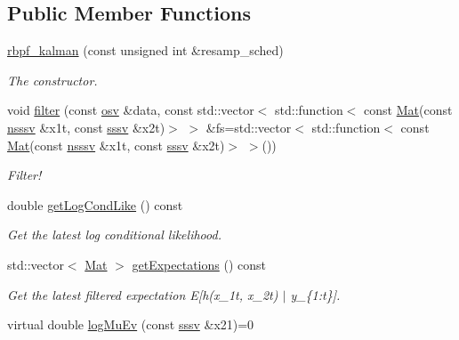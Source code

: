 \subsection*{Public Member Functions}
\begin{DoxyCompactItemize}
\item 
\hyperlink{classrbpf__kalman_abb378b7dd21fcf397d0f826ec4310244}{rbpf\+\_\+kalman} (const unsigned int \&resamp\+\_\+sched)
\begin{DoxyCompactList}\small\item\em The constructor. \end{DoxyCompactList}\item 
void \hyperlink{classrbpf__kalman_a66de4ab69c970a44493332f060380e65}{filter} (const \hyperlink{classrbpf__kalman_a4fdeb1b9b626811569b6ac4327c6cbb2}{osv} \&data, const std\+::vector$<$ std\+::function$<$ const \hyperlink{classrbpf__kalman_a042212551b46f72a5d3d58f7073d19ee}{Mat}(const \hyperlink{classrbpf__kalman_a887899234c374a04beba9669418577a7}{nsssv} \&x1t, const \hyperlink{classrbpf__kalman_a17f2cf0b4ee4a1c8f2bfdb5356c53844}{sssv} \&x2t)$>$ $>$ \&fs=std\+::vector$<$ std\+::function$<$ const \hyperlink{classrbpf__kalman_a042212551b46f72a5d3d58f7073d19ee}{Mat}(const \hyperlink{classrbpf__kalman_a887899234c374a04beba9669418577a7}{nsssv} \&x1t, const \hyperlink{classrbpf__kalman_a17f2cf0b4ee4a1c8f2bfdb5356c53844}{sssv} \&x2t)$>$ $>$())
\begin{DoxyCompactList}\small\item\em Filter! \end{DoxyCompactList}\item 
double \hyperlink{classrbpf__kalman_a7000f0729ec1a75084ba4bd9bf06584d}{get\+Log\+Cond\+Like} () const 
\begin{DoxyCompactList}\small\item\em Get the latest log conditional likelihood. \end{DoxyCompactList}\item 
std\+::vector$<$ \hyperlink{classrbpf__kalman_a042212551b46f72a5d3d58f7073d19ee}{Mat} $>$ \hyperlink{classrbpf__kalman_a12e9a481808fff0d74190efcc8714ca0}{get\+Expectations} () const 
\begin{DoxyCompactList}\small\item\em Get the latest filtered expectation E\mbox{[}h(x\+\_\+1t, x\+\_\+2t) $\vert$ y\+\_\+\{1\+:t\}\mbox{]}. \end{DoxyCompactList}\item 
virtual double \hyperlink{classrbpf__kalman_a692103dd55c0c0dab71bfbe347fffaba}{log\+Mu\+Ev} (const \hyperlink{classrbpf__kalman_a17f2cf0b4ee4a1c8f2bfdb5356c53844}{sssv} \&x21)=0

\end{DoxyCompactItemize}
